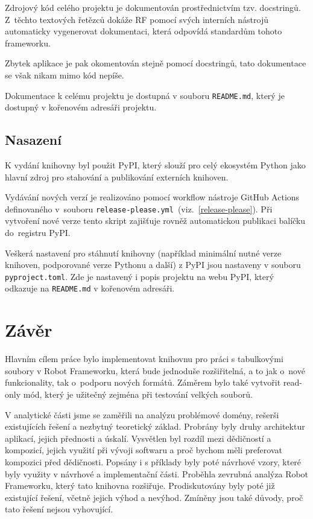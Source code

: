 Zdrojový kód celého projektu je dokumentován prostřednictvím tzv. docstringů. Z~těchto textových řetězců dokáže RF pomocí svých interních nástrojů automaticky vygenerovat dokumentaci, která odpovídá standardům tohoto frameworku.

Zbytek aplikace je pak okomentován stejně pomocí docstringů, tato dokumentace se však nikam mimo kód nepíše.

Dokumentace k celému projektu je dostupná v souboru \texttt{README.md}, který je dostupný v kořenovém adresáři projektu.

\section{Nasazení}

K vydání knihovny byl použit PyPI, který slouží pro celý ekosystém Python jako hlavní zdroj pro stahování a publikování externích knihoven.

Vydávání nových verzí je realizováno pomocí workflow nástroje GitHub Actions definovaného v~souboru \texttt{release-please.yml}~(viz.~\ref{release-please}). Při vytvoření nové verze tento skript zajišťuje rovněž automatickou publikaci balíčku do~registru PyPI.

Veškerá nastavení pro stáhnutí knihovny (například minimální nutné verze knihoven, podporované verze Pythonu a další) z PyPI jsou nastaveny v souboru \texttt{pyproject.toml}. Zde je nastavený i popis projektu na webu PyPI, který odkazuje na \texttt{README.md} v kořenovém adresáři.

\chapter{Závěr}

Hlavním cílem práce bylo implementovat knihovnu pro práci s tabulkovými soubory v Robot Frameworku, která bude jednoduše rozšiřitelná, a to jak o~nové funkcionality, tak o~podporu nových formátů. Záměrem bylo také vytvořit read-only mód, který je užitečný zejména při testování velkých souborů.

V analytické části jsme se zaměřili na analýzu problémové domény, rešerši existujících řešení a nezbytný teoretický základ. Probrány byly druhy architektur aplikací, jejich přednosti a úskalí. Vysvětlen byl rozdíl mezi dědičností a kompozicí, jejich využití při vývoji softwaru a proč bychom měli preferovat kompozici před dědičnosti. Popsány i s příklady byly poté návrhové vzory, které byly využity v návrhové a implementační části. Proběhla zevrubná analýza Robot Frameworku, který tato knihovna rozšiřuje. Prodiskutovány byly poté již existující řešení, včetně jejich výhod a nevýhod. Zmíněny jsou také důvody, proč tato řešení nejsou vyhovující.

